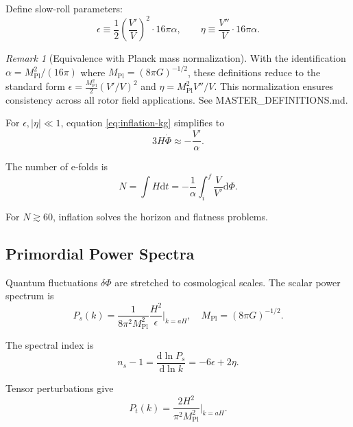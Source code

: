 \documentclass[11pt,a4paper]{article}
\numberwithin{equation}{section}
\theoremstyle{plain}
\theoremstyle{definition}
\theoremstyle{remark}
\newtheorem{remark}[theorem]{Remark}
\newcommand{\dd}{\mathrm{d}}
\begin{document}
Define slow-roll parameters:
\begin{equation}
\epsilon \equiv \frac{1}{2}\left(\frac{V'}{V}\right)^2 \cdot 16\pi\alpha, \qquad \eta \equiv \frac{V''}{V} \cdot 16\pi\alpha.
\label{eq:slow-roll-params}
\end{equation}

\begin{remark}[Equivalence with Planck mass normalization]
With the identification $\alpha = M_{\mathrm{Pl}}^2/(16\pi)$ where $M_{\mathrm{Pl}} = (8\pi G)^{-1/2}$, these definitions reduce to the standard form $\epsilon = \frac{M_{\mathrm{Pl}}^2}{2}(V'/V)^2$ and $\eta = M_{\mathrm{Pl}}^2 V''/V$. This normalization ensures consistency across all rotor field applications. See MASTER\_DEFINITIONS.md.
\end{remark}

For $\epsilon, |\eta| \ll 1$, equation \eqref{eq:inflation-kg} simplifies to
\begin{equation}
3H\dot{\Phi} \approx -\frac{V'}{\alpha}.
\end{equation}

The number of e-folds is
\begin{equation}
N = \int H\dd t = -\frac{1}{\alpha}\int_{i}^{f} \frac{V}{V'}\dd\Phi.
\label{eq:efolds}
\end{equation}

For $N \gtrsim 60$, inflation solves the horizon and flatness problems.

\subsection{Primordial Power Spectra}

Quantum fluctuations $\delta\Phi$ are stretched to cosmological scales. The scalar power spectrum is
\begin{equation}
P_s(k) = \frac{1}{8\pi^2 M_{\mathrm{Pl}}^2}\frac{H^2}{\epsilon}\bigg|_{k=aH},
\quad M_{\mathrm{Pl}} = (8\pi G)^{-1/2}.
\label{eq:scalar-spectrum}
\end{equation}

The spectral index is
\begin{equation}
n_s - 1 = \frac{\dd\ln P_s}{\dd\ln k} = -6\epsilon + 2\eta.
\label{eq:spectral-index}
\end{equation}

Tensor perturbations give
\begin{equation}
P_t(k) = \frac{2H^2}{\pi^2 M_{\mathrm{Pl}}^2}\bigg|_{k=aH}.
\end{equation}
\end{document}
